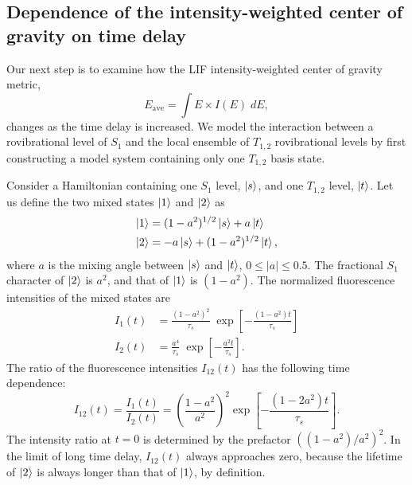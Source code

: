 \documentclass[12pt]{mitthesis}
\begin{document}
\subsection{Dependence of the intensity-weighted center of gravity on
  time delay}

Our next step is to examine how the LIF intensity-weighted center of
gravity metric,
\begin{equation}
  E_{\text{ave}} = \int E \times I(E) \; dE,
\end{equation}
changes as the time delay is increased.  We model the interaction
between a rovibrational level of $S_1$ and the local ensemble of
$T_{1,2}$ rovibrational levels by first constructing a model system
containing only one $T_{1,2}$ basis state.


Consider a Hamiltonian containing one $S_1$ level, $\mathinner{|{s}\rangle}$, and one
$T_{1,2}$ level, $\mathinner{|{t}\rangle}$.  Let us define the two mixed states
$\mathinner{|{1}\rangle}$ and $\mathinner{|{2}\rangle}$ as
\begin{equation}
  \begin{split}
    \mathinner{|{1}\rangle} &=  (1 - a^2)^{1/2} \mathinner{|{s}\rangle} + a \mathinner{|{t}\rangle}\\
    \mathinner{|{2}\rangle} &= -a \mathinner{|{s}\rangle} + (1 - a^2)^{1/2} \mathinner{|{t}\rangle},
  \end{split}
\end{equation}
where $a$ is the mixing angle between $\mathinner{|{s}\rangle}$ and $\mathinner{|{t}\rangle}$, $0 \leq
\lvert a \rvert \leq 0.5$.  The fractional $S_1$ character of
$\mathinner{|{2}\rangle}$ is $a^2$, and that of $\mathinner{|{1}\rangle}$ is $(1 - a^2)$.  The
normalized fluorescence intensities of the mixed states are
\begin{equation}
  \begin{split}
    I_1(t) &= \frac{(1 - a^2)^2}{\tau_s} \; \exp 
          \left[
            - \frac{(1 - a^2) t}{\tau_s}
          \right]\\
    I_2(t) &= \frac{a^4}{\tau_s} \; \exp 
          \left[
            - \frac{a^2 t}{\tau_s}
          \right].
  \end{split}
\end{equation}
The ratio of the fluorescence intensities $I_{12}(t)$ has the
following time dependence:
\begin{equation}
  I_{12}(t) = \frac{I_1(t)}{I_2(t)} = 
  \left(
    \frac{1 - a^2}{a^2}
  \right)^2
  \exp
  \left[
    - \frac{(1 - 2a^2) t}{\tau_s}
  \right].
\end{equation}  
The intensity ratio at $t=0$ is determined by the prefactor $( (1 -
a^2)/a^2 )^2$.  In the limit of long time delay, $I_{12}(t)$
always approaches zero, because the lifetime of $\mathinner{|{2}\rangle}$ is always
longer than that of $\mathinner{|{1}\rangle}$, by definition.  
\end{document}
